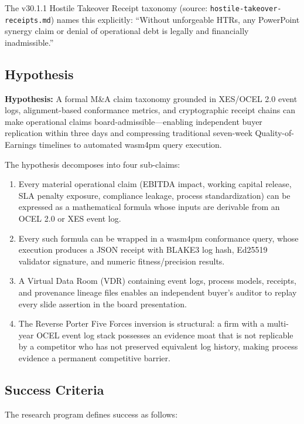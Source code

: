 The v30.1.1 Hostile Takeover Receipt taxonomy (source: \texttt{hostile-takeover-receipts.md})
names this explicitly: ``Without unforgeable HTRs, any PowerPoint synergy claim or denial of
operational debt is legally and financially inadmissible.''

\subsection{Hypothesis}
\label{sec:ma-rq-hypothesis}

\textbf{Hypothesis:} A formal M\&A claim taxonomy grounded in XES/OCEL 2.0 event logs,
alignment-based conformance metrics, and cryptographic receipt chains can make operational
claims board-admissible---enabling independent buyer replication within three days and
compressing traditional seven-week Quality-of-Earnings timelines to automated wasm4pm query
execution.

The hypothesis decomposes into four sub-claims:

\begin{enumerate}
  \item Every material operational claim (EBITDA impact, working capital release, SLA penalty
    exposure, compliance leakage, process standardization) can be expressed as a mathematical
    formula whose inputs are derivable from an OCEL 2.0 or XES event log.
  \item Every such formula can be wrapped in a wasm4pm conformance query, whose execution
    produces a JSON receipt with BLAKE3 log hash, Ed25519 validator signature, and numeric
    fitness/precision results.
  \item A Virtual Data Room (VDR) containing event logs, process models, receipts, and
    provenance lineage files enables an independent buyer's auditor to replay every slide
    assertion in the board presentation.
  \item The Reverse Porter Five Forces inversion is structural: a firm with a multi-year OCEL
    event log stack possesses an evidence moat that is not replicable by a competitor who has
    not preserved equivalent log history, making process evidence a permanent competitive
    barrier.
\end{enumerate}

\subsection{Success Criteria}
\label{sec:ma-rq-success}

The research program defines success as follows:

